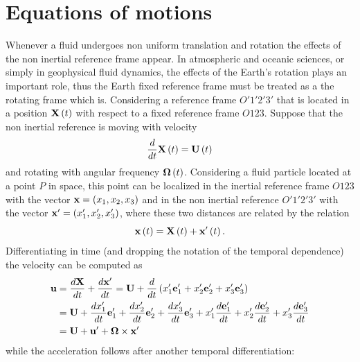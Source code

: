 \section{Equations of motions}\label{motionEQ}
Whenever a fluid undergoes non uniform translation and rotation the effects of the non inertial reference frame appear. In atmospheric and oceanic sciences, or simply in geophysical fluid dynamics, the effects of the Earth's rotation plays an important role, thus the Earth fixed reference frame must be treated as a the rotating frame which is. Considering a reference frame $O'1'2'3'$ that is located in a position $\mathbf{X}\left( t \right)$ with respect to a fixed reference frame $O123$. Suppose that the non inertial reference is moving with velocity
\begin{equation*}
\dfrac{d}{dt}\mathbf{X}\left( t \right)=\mathbf{U}\left( t \right)
\end{equation*}
and rotating with angular frequency $\boldsymbol{\Omega}\left( t \right)$. Considering a fluid particle located at a point $P$ in space, this point can be localized in the inertial reference frame $O123$ with the vector $\mathbf{x}=\left( x_{1},x_{2},x_{3} \right)$ and in the non inertial reference $O'1'2'3'$ with the vector $\mathbf{x}'=\left( x_{1}',x_{2}',x_{3}' \right)$, where these two distances are related by the relation
\begin{equation*}
\mathbf{x}\left( t \right)=\mathbf{X}\left( t \right)+\mathbf{x}'\left( t \right).
\end{equation*}
Differentiating in time (and dropping the notation of the temporal dependence) the velocity can be computed as
\begin{align*}
\mathbf{u}&=\dfrac{d\mathbf{X}}{dt}+\dfrac{d\mathbf{x}'}{dt}=\mathbf{U}+\dfrac{d}{dt}\left( x_{1}'\mathbf{e}_{1}'+x_{2}'\mathbf{e}_{2}'+x_{3}'\mathbf{e}_{3}' \right)\\
&=\mathbf{U}+\dfrac{dx_{1}'}{dt}\mathbf{e}_{1}'+\dfrac{dx_{2}'}{dt}\mathbf{e}_{2}'+\dfrac{dx_{3}'}{dt}\mathbf{e}_{3}'+x_{1}'\dfrac{d\mathbf{e}_{1}'}{dt}+x_{2}'\dfrac{d\mathbf{e}_{2}'}{dt}+x_{3}'\dfrac{d\mathbf{e}_{3}'}{dt}\\
&=\mathbf{U}+\mathbf{u}'+\boldsymbol{\Omega}\times\mathbf{x}'
\end{align*}
while the acceleration follows after another temporal differentiation:
